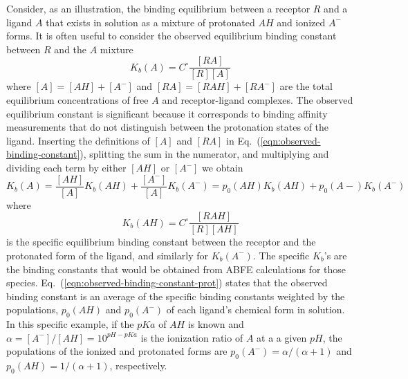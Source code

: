 \documentclass[9pt,bestpractices]{livecoms}
\begin{document}
Consider, as an illustration, the binding equilibrium between a receptor $R$ and a ligand $A$ that exists in solution as a mixture of protonated $AH$ and ionized $A^-$ forms. It is often useful to consider the observed equilibrium binding constant between $R$ and the $A$ mixture 
\begin{equation}
  K_b(A) = C^\circ \frac{[RA]}{[R][A]}
  \label{eqn:observed-binding-constant}
\end{equation}
where $[A] = [AH] + [A^-]$ and $[RA] = [RAH] + [RA^-]$ are the total equilibrium concentrations of free $A$ and receptor-ligand complexes. The observed equilibrium constant is significant because it corresponds to binding affinity measurements that do not distinguish between the protonation states of the ligand. Inserting the definitions of $[A]$ and $[RA]$ in Eq.~(\ref{eqn:observed-binding-constant}), splitting the sum in the numerator, and multiplying and dividing each term by either $[AH]$ or $[A^-]$ we obtain
\begin{equation}
  K_b(A) = \frac{[AH]}{[A]}  K_b(AH) +  \frac{[A^-]}{[A]} K_b(A^-) =  p_0(AH) K_b(AH) +  p_0(A-) K_b(A^-)
  \label{eqn:observed-binding-constant-split}
\end{equation}
where
\begin{equation}
  K_b(AH) = C^\circ \frac{[RAH]}{[R][AH]}
  \label{eqn:observed-binding-constant-prot}
\end{equation}
is the specific equilibrium binding constant between the receptor and the protonated form of the ligand, and similarly for $K_b(A^-)$. The specific $K_b$'s are the binding constants that would be obtained from ABFE calculations for those species. Eq.~(\ref{eqn:observed-binding-constant-prot}) states that the observed binding constant is an average of the specific binding constants weighted by the populations, $p_0(AH)$ and  $p_0(A^-)$ of each ligand's chemical form in solution. In this specific example, if the $pKa$ of $AH$ is known and $\alpha = [A^-]/[AH] = 10^{pH-pKa} $ is the ionization ratio of $A$ at a a given $pH$, the populations of the ionized and protonated forms are $p_0(A^-) = \alpha/(\alpha+1)$ and $p_0(AH) = 1/(\alpha+1)$, respectively.\cite{champion2024multistate,azimi2022application}
\end{document}

